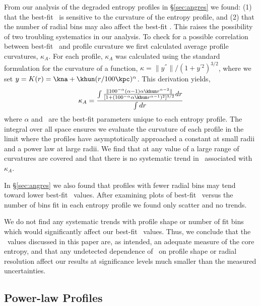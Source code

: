 \documentclass{emulateapj}
\begin{document}
From our analysis of the degraded entropy profiles in
\S\ref{sec:angres} we found: (1) that the best-fit \kna\ is sensitive
to the curvature of the entropy profile, and (2) that the number of
radial bins may also affect the best-fit \kna. This raises the
possibility of two troubling systematics in our analysis. To check for
a possible correlation between best-fit \kna\ and profile curvature we
first calculated average profile curvatures, $\kappa_A$. For each
profile, $\kappa_A$ was calculated using the standard formulation for
the curvature of a function, $\kappa = \|y^{''}\|/(1+y^{'2})^{3/2}$,
where we set $y = K(r) = \kna+\khun(r/100\kpc)^{\alpha}$. This
derivation yields,
\begin{equation}
\kappa_A = \frac{\int\frac{\| 100^{-\alpha} (\alpha-1) \alpha \khun
  r^{\alpha-2}\|}{[1+(100^{-\alpha} \alpha \khun
    r^{\alpha-1})^2]^{3/2}} dr}{\int dr}
\end{equation}
where $\alpha$ and \khun\ are the best-fit parameters unique to each
entropy profile. The integral over all space ensures we evaluate the
curvature of each profile in the limit where the profiles have
asymptotically approached a constant at small radii and a power law at
large radii. We find that at any value of \kna a large range of
curvatures are covered and that there is no systematic trend in
\kna\ associated with $\kappa_A$.

In \S\ref{sec:angres} we also found that profiles with fewer radial
bins may tend toward lower best-fit \kna\ values. After examining
plots of best-fit \kna\ versus the number of bins fit in each entropy
profile we found only scatter and no trends.

We do not find any systematic trends with profile shape or number of
fit bins which would significantly affect our best-fit
\kna\ values. Thus, we conclude that the \kna\ values discussed in
this paper are, as intended, an adequate measure of the core entropy,
and that any undetected dependence of \kna\ on profile shape or radial
resolution affect our results at significance levels much smaller than
the measured uncertainties.

\subsection{Power-law Profiles}
\label{sec:quality}
\end{document}
